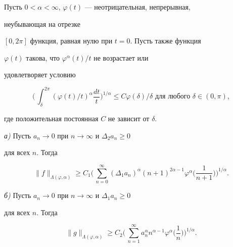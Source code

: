 \begin{assrt}


Пусть $0<\alpha<\infty$, $\varphi(t)$ --- неотрицательная, непрерывная,


неубывающая на отрезке


$[0,2\pi]$ функция, равная нулю при $t=0$. Пусть также функция


$\varphi(t)$ такова, что $\varphi^\alpha(t)/t$ не возрастает или


удовлетворяет условию


\begin{equation}


\biggl(\,\int^{2\pi}_\delta(\varphi(t)/t)^\alpha\frac{dt}{t}


\biggr)^{1/\alpha}\le C\varphi(\delta)/\delta


\text{ для любого }\delta\in(0,\pi),


\end{equation}


где положительная постоянная $C$ не зависит от $\delta$.





{\em а)} Пусть $a_n\to 0$ при $n\to\infty$ и $\Delta_2a_n\ge 0$


для всех $n$. Тогда


\begin{equation}


\|f\|_{\Lambda(\varphi,\alpha)}\ge C_1\biggl(\,


\sum^\infty_{n=0}(\Delta_1a_n)^\alpha(n+1)^{2\alpha-1}


\varphi^\alpha\biggl(\frac{1}{n+1} \biggr)\biggr)^{1/\alpha}.


\end{equation}





{\em б)} Пусть $a_n\to 0$ при $n\to\infty$ и $\Delta_1a_n\ge 0$


для всех $n$. Тогда


\begin{equation}


\|g\|_{\Lambda(\varphi,\alpha)}\ge C_2\biggl(\,


\sum^\infty_{n=1}a^\alpha_n n^{\alpha-1}


\varphi^\alpha\biggl(\frac{1}{n} \biggr)\biggr)^{1/\alpha}.


\end{equation}






\end{assrt}
